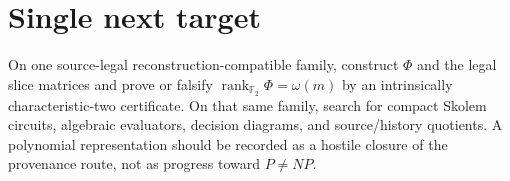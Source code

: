\documentclass[11pt]{article}
\begin{document}
\section*{Single next target}
On one source-legal reconstruction-compatible family, construct \(\Phi\) and the legal
slice matrices and prove or falsify \(\operatorname{rank}_{\mathbb F_2}\Phi=\omega(m)\)
by an intrinsically characteristic-two certificate. On that same family, search for
compact Skolem circuits, algebraic evaluators, decision diagrams, and source/history
quotients. A polynomial representation should be recorded as a hostile closure of the
provenance route, not as progress toward \(P\neq NP\).

\end{document}
